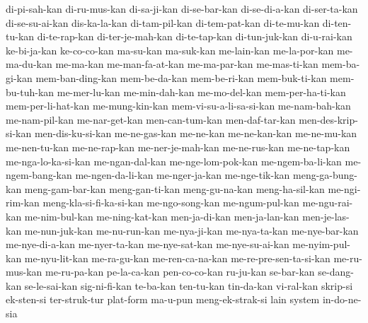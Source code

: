 {  di-pi-sah-kan di-ru-mus-kan di-sa-ji-kan di-se-bar-kan di-se-di-a-kan di-ser-ta-kan
  di-se-su-ai-kan dis-ka-la-kan di-tam-pil-kan di-tem-pat-kan di-te-mu-kan di-ten-tu-kan
  di-te-rap-kan di-ter-je-mah-kan di-te-tap-kan di-tun-juk-kan di-u-rai-kan ke-bi-ja-kan
  ke-co-co-kan ma-su-kan ma-suk-kan me-lain-kan me-la-por-kan me-ma-du-kan
  me-ma-kan me-man-fa-at-kan me-ma-par-kan me-mas-ti-kan mem-ba-gi-kan mem-ban-ding-kan
  mem-be-da-kan mem-be-ri-kan mem-buk-ti-kan mem-bu-tuh-kan me-mer-lu-kan me-min-dah-kan
  me-mo-del-kan mem-per-ha-ti-kan mem-per-li-hat-kan me-mung-kin-kan mem-vi-su-a-li-sa-si-kan me-nam-bah-kan
  me-nam-pil-kan me-nar-get-kan men-can-tum-kan men-daf-tar-kan men-des-krip-si-kan men-dis-ku-si-kan
  me-ne-gas-kan me-ne-kan me-ne-kan-kan me-ne-mu-kan me-nen-tu-kan me-ne-rap-kan
  me-ner-je-mah-kan me-ne-rus-kan me-ne-tap-kan me-nga-lo-ka-si-kan me-ngan-dal-kan me-nge-lom-pok-kan
  me-ngem-ba-li-kan me-ngem-bang-kan me-ngen-da-li-kan me-nger-ja-kan me-nge-tik-kan meng-ga-bung-kan
  meng-gam-bar-kan meng-gan-ti-kan meng-gu-na-kan meng-ha-sil-kan me-ngi-rim-kan meng-kla-si-fi-ka-si-kan
  me-ngo-song-kan me-ngum-pul-kan me-ngu-rai-kan me-nim-bul-kan me-ning-kat-kan men-ja-di-kan
  men-ja-lan-kan men-je-las-kan me-nun-juk-kan me-nu-run-kan me-nya-ji-kan me-nya-ta-kan
  me-nye-bar-kan me-nye-di-a-kan me-nyer-ta-kan me-nye-sat-kan me-nye-su-ai-kan me-nyim-pul-kan
  me-nyu-lit-kan me-ra-gu-kan me-ren-ca-na-kan me-re-pre-sen-ta-si-kan me-ru-mus-kan me-ru-pa-kan
  pe-la-ca-kan pen-co-co-kan ru-ju-kan se-bar-kan se-dang-kan se-le-sai-kan
  sig-ni-fi-kan te-ba-kan ten-tu-kan tin-da-kan vi-ral-kan
  skrip-si ek-sten-si ter-struk-tur plat-form ma-u-pun meng-ek-strak-si lain system in-do-ne-sia
}
